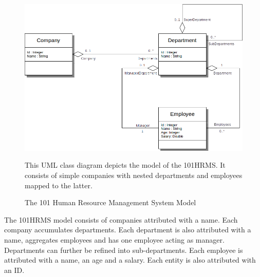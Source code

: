 \begin{figure}[h!]
\begin{center}
\includegraphics[scale=.5]{images/101HRMSModel.png}
\end{center}
{
\scriptsize 
This \acrshort{UML} class diagram depicts the model of the \acrfull{101HRMS}.
It consists of simple companies with nested departments and employees mapped to the latter.
}
\caption{The 101 Human Resource Management System Model}
\label{figure:101HRMSModel}
\end{figure}

The \acrshort{101HRMS} model consists of companies attributed with a name.
Each company accumulates departments.
Each department is also attributed with a name, aggregates employees and has one employee acting as manager.
Departments can further be refined into sub-departments.
Each employee is attributed with a name, an age and a salary.
Each entity is also attributed with an ID.

